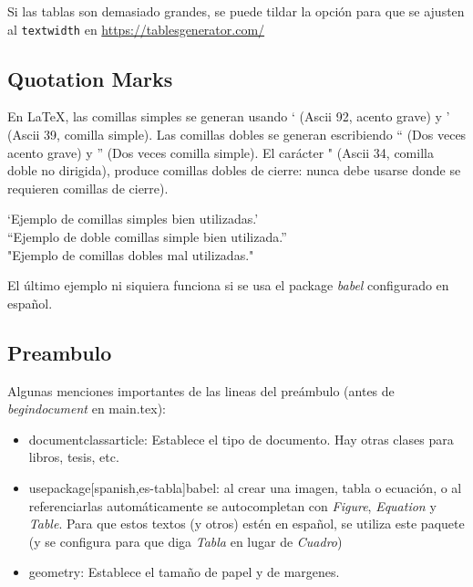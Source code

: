 Si las tablas son demasiado grandes, se puede tildar la opción para que se ajusten al \texttt{textwidth} en \url{https://tablesgenerator.com/} 

\subsection{Quotation Marks}

En LaTeX, las comillas simples se generan usando ` (Ascii 92, acento grave) y ' (Ascii 39, comilla simple). Las comillas dobles se generan escribiendo `` (Dos veces acento grave) y '' (Dos veces comilla simple). El carácter " (Ascii 34, comilla doble no dirigida), produce comillas dobles de cierre: nunca debe usarse donde se requieren comillas de cierre).

\begin{center}

`Ejemplo de comillas simples bien utilizadas.' \\

``Ejemplo de doble comillas simple bien utilizada.'' \\

"Ejemplo de comillas dobles mal utilizadas."

\end{center}

El último ejemplo ni siquiera funciona si se usa el package \textit{babel} configurado en español.

\subsection{Preambulo}

Algunas menciones importantes de las lineas del preámbulo (antes de \textit{begin{document}} en main.tex):

\begin{itemize}
    \item documentclass{article}: Establece el tipo de documento. Hay otras clases para libros, tesis, etc.
    \item usepackage[spanish,es-tabla]{babel}: al crear una imagen, tabla o ecuación, o al referenciarlas automáticamente se autocompletan con \textit{Figure}, \textit{Equation} y \textit{Table}. Para que estos textos (y otros) estén en español, se utiliza este paquete (y se configura para que diga \textit{Tabla} en lugar de \textit{Cuadro})
    \item [a4paper,margin=1in]{geometry}: Establece el tamaño de papel y de margenes.
\end{itemize}

